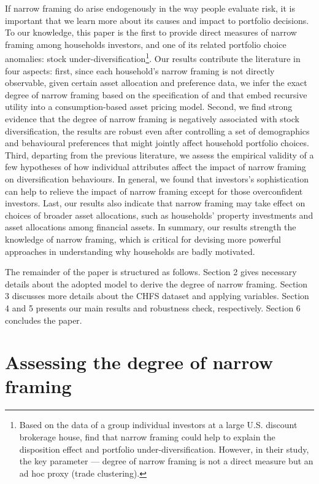 \documentclass[ukenglish,nottitlepage,thmsb,11pt,letterpaper]{article}
\begin{document}
If narrow framing do arise endogenously in the way people evaluate risk, it is important that we learn more about its causes and impact to portfolio decisions. To our knowledge, this paper is the first to provide direct measures of narrow framing among households investors, and one of its related portfolio choice anomalies: stock under-diversification\footnote{Based on the data of a group individual investors at a large U.S. discount brokerage house, \citet{Kumar2008} find that narrow framing could help to explain the disposition effect and portfolio under-diversification. However, in their study, the key parameter --- degree of narrow framing is not a direct measure but an ad hoc proxy (trade clustering).}. Our results contribute the literature in four aspects: first, since each household's narrow framing is not directly observable, given certain asset allocation and preference data, we infer the exact degree of narrow framing based on the specification of \citet{Barberis2006} and \citet{Barberis2009} that embed recursive utility into a consumption-based asset pricing model\citep{Epstein1989,Epstein1991}. Second, we find strong evidence that the degree of narrow framing is negatively associated with stock diversification, the results are robust even after controlling a set of demographics and behavioural preferences that might jointly affect household portfolio choices. Third, departing from the previous literature, we assess the empirical validity of a few hypotheses of how individual attributes affect the impact of narrow framing on diversification behaviours. In general, we found that investors's sophistication can help to relieve the impact of narrow framing except for those overconfident investors. Last, our results also indicate that narrow framing may take effect on choices of broader asset allocations, such as households' property investments and asset allocations among financial assets. In summary, our results strength the knowledge of narrow framing, which is critical for devising more powerful approaches in understanding why households are badly motivated.

The remainder of the paper is structured as follows. Section 2 gives necessary details about the adopted model to derive the degree of narrow framing. Section 3 discusses more details about the CHFS dataset and applying variables. Section 4 and 5 presents our main results and robustness check, respectively. Section 6 concludes the paper.

\section{Assessing the degree of narrow framing}
\end{document}

